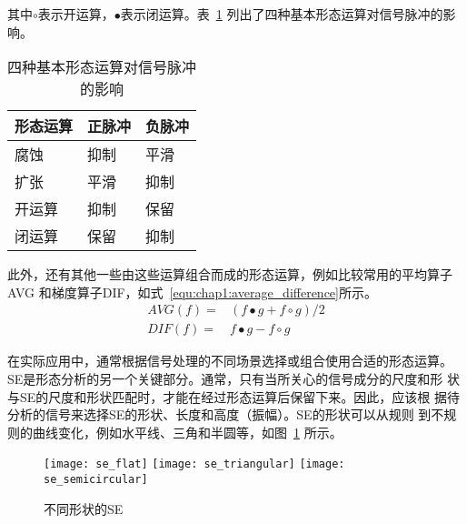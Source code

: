 其中$\circ$表示开运算，$\bullet$表示闭运算。表~\ref{tab:morphological_operator_effect}
列出了四种基本形态运算对信号脉冲的影响。
\begin{table}[htb]
  \centering
  \begin{minipage}[t]{0.6\linewidth}
  \caption{四种基本形态运算对信号脉冲的影响}
  \label{tab:morphological_operator_effect}
    \begin{tabularx}{\linewidth}{XXX}
      \toprule[1.5pt]
      形态运算 & 正脉冲 & 负脉冲 \\\midrule[1pt]
      腐蚀 & 抑制 & 平滑 \\
      扩张 & 平滑 & 抑制 \\
      开运算 & 抑制 & 保留 \\
      闭运算 & 保留 & 抑制 \\
      \bottomrule[1.5pt]
    \end{tabularx}
  \end{minipage}
\end{table}

此外，还有其他一些由这些运算组合而成的形态运算，例如比较常用的平均算子AVG
和梯度算子DIF，如式~\ref{equ:chap1:average_difference}所示。
\begin{equation}
  \label{equ:chap1:average_difference}
  \begin{aligned}
    AVG(f) = & (f\bullet g + f\circ g)/2 \\
    DIF(f) = & f\bullet g - f\circ g 
  \end{aligned}
\end{equation}

在实际应用中，通常根据信号处理的不同场景选择或组合使用合适的形态运算。
SE是形态分析的另一个关键部分。通常，只有当所关心的信号成分的尺度和形
状与SE的尺度和形状匹配时，才能在经过形态运算后保留下来。因此，应该根
据待分析的信号来选择SE的形状、长度和高度（振幅）。SE的形状可以从规则
到不规则的曲线变化，例如水平线、三角和半圆等，如图~\ref{fig:se_shape}
所示。
\begin{figure}[ht]
  \centering
  {\texttt{[image: se\_flat]}}
  \hspace{4em}
  {\texttt{[image: se\_triangular]}}
  \hspace{4em}
  {\texttt{[image: se\_semicircular]}}
  \caption{不同形状的SE}
  \label{fig:se_shape}
\end{figure}

